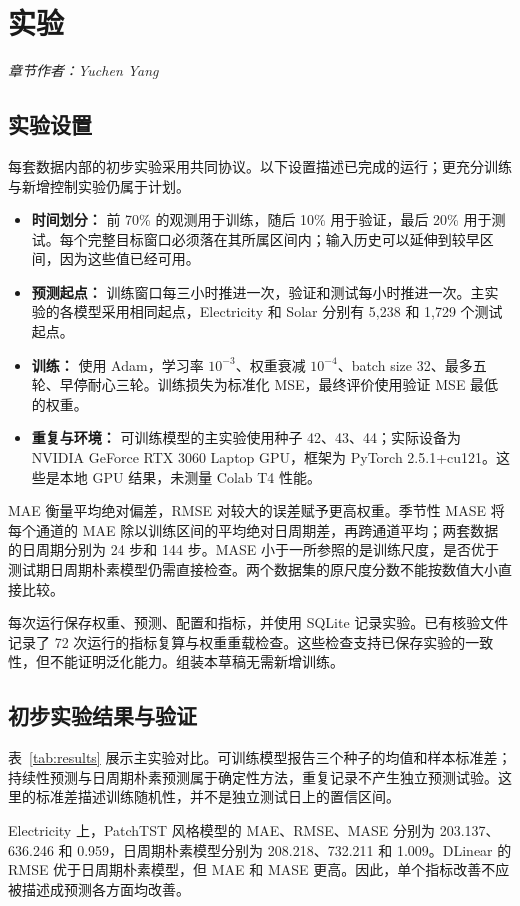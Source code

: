 \documentclass[12pt,a4paper,UTF8]{ctexart}
\newcommand{\sectionauthor}[1]{\noindent\textit{章节作者：#1}\par\vspace{3pt}}
\begin{document}
\FloatBarrier
\section{实验}\label{sec:experiments}
\sectionauthor{Yuchen Yang}
\subsection{实验设置}
每套数据内部的初步实验采用共同协议。以下设置描述已完成的运行；更充分训练与新增控制实验仍属于计划。
\begin{itemize}
\item \textbf{时间划分：} 前 70\% 的观测用于训练，随后 10\% 用于验证，最后 20\% 用于测试。每个完整目标窗口必须落在其所属区间内；输入历史可以延伸到较早区间，因为这些值已经可用。
\item \textbf{预测起点：} 训练窗口每三小时推进一次，验证和测试每小时推进一次。主实验的各模型采用相同起点，Electricity 和 Solar 分别有 5,238 和 1,729 个测试起点。
\item \textbf{训练：} 使用 Adam，学习率 $10^{-3}$、权重衰减 $10^{-4}$、batch size 32、最多五轮、早停耐心三轮。训练损失为标准化 MSE，最终评价使用验证 MSE 最低的权重。
\item \textbf{重复与环境：} 可训练模型的主实验使用种子 42、43、44；实际设备为 NVIDIA GeForce RTX 3060 Laptop GPU，框架为 PyTorch 2.5.1+cu121。这些是本地 GPU 结果，未测量 Colab T4 性能。
\end{itemize}
MAE 衡量平均绝对偏差，RMSE 对较大的误差赋予更高权重。季节性 MASE 将每个通道的 MAE 除以训练区间的平均绝对日周期差，再跨通道平均\cite{mase}；两套数据的日周期分别为 24 步和 144 步。MASE 小于一所参照的是训练尺度，是否优于测试期日周期朴素模型仍需直接检查。两个数据集的原尺度分数不能按数值大小直接比较。

每次运行保存权重、预测、配置和指标，并使用 SQLite 记录实验。已有核验文件记录了 72 次运行的指标复算与权重重载检查。这些检查支持已保存实验的一致性，但不能证明泛化能力。组装本草稿无需新增训练。

\subsection{初步实验结果与验证}
表~\ref{tab:results} 展示主实验对比。可训练模型报告三个种子的均值和样本标准差；持续性预测与日周期朴素预测属于确定性方法，重复记录不产生独立预测试验。这里的标准差描述训练随机性，并不是独立测试日上的置信区间。



Electricity 上，PatchTST 风格模型的 MAE、RMSE、MASE 分别为 203.137、636.246 和 0.959，日周期朴素模型分别为 208.218、732.211 和 1.009。DLinear 的 RMSE 优于日周期朴素模型，但 MAE 和 MASE 更高。因此，单个指标改善不应被描述成预测各方面均改善。
\end{document}
